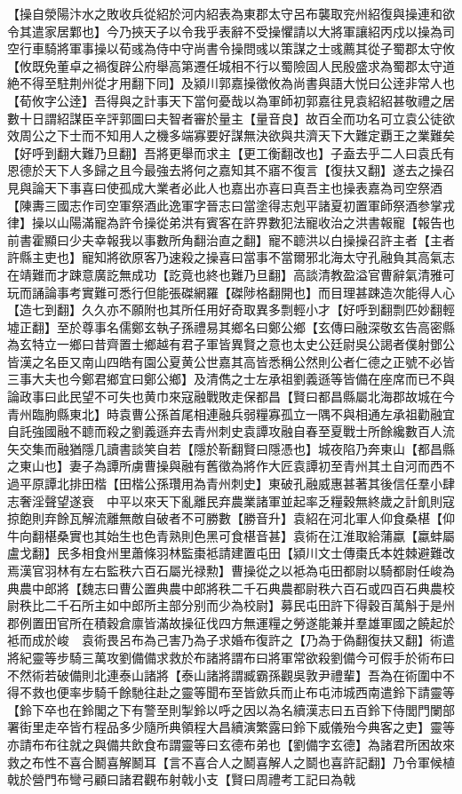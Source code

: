 【操自滎陽汴水之敗收兵從紹於河内紹表為東郡太守呂布襲取兖州紹復與操連和欲令其遣家居鄴也】今乃挾天子以令我乎表辭不受操懼請以大將軍讓紹丙戍以操為司空行車騎將軍事操以荀彧為侍中守尚書令操問彧以策謀之士彧薦其從子蜀郡太守攸【攸既免董卓之禍復辟公府舉高第遷任城相不行以蜀險固人民殷盛求為蜀郡太守道絶不得至駐荆州從才用翻下同】及潁川郭嘉操徵攸為尚書與語大悦曰公逹非常人也【荀攸字公逹】吾得與之計事天下當何憂哉以為軍師初郭嘉往見袁紹紹甚敬禮之居數十日謂紹謀臣辛評郭圖曰夫智者審於量主【量音良】故百全而功名可立袁公徒欲效周公之下士而不知用人之機多端寡要好謀無決欲與共濟天下大難定覇王之業難矣【好呼到翻大難乃旦翻】吾將更舉而求主【更工衡翻改也】子盍去乎二人曰袁氏有恩德於天下人多歸之且今最強去將何之嘉知其不寤不復言【復扶又翻】遂去之操召見與論天下事喜曰使孤成大業者必此人也嘉出亦喜曰真吾主也操表嘉為司空祭酒【陳夀三國志作司空軍祭酒此逸軍字晉志曰當塗得志剋平諸夏初置軍師祭酒参掌戎律】操以山陽滿寵為許令操從弟洪有賓客在許界數犯法寵收治之洪書報寵【報告也前書霍顯曰少夫幸報我以事數所角翻治直之翻】寵不聼洪以白操操召許主者【主者許縣主吏也】寵知將欲原客乃速殺之操喜曰當事不當爾邪北海太守孔融負其高氣志在靖難而才踈意廣訖無成功【訖竟也終也難乃旦翻】高談清教盈溢官曹辭氣清雅可玩而誦論事考實難可悉行但能張磔網羅【磔陟格翻開也】而目理甚踈造次能得人心【造七到翻】久久亦不願附也其所任用好奇取異多剽輕小才【好呼到翻剽匹妙翻輕墟正翻】至於尊事名儒鄭玄執子孫禮易其鄉名曰鄭公鄉【玄傳曰融深敬玄告高密縣為玄特立一鄉曰昔齊置士鄉越有君子軍皆異賢之意也太史公廷尉吳公謁者僕射鄧公皆漢之名臣又南山四皓有園公夏黄公世嘉其高皆悉稱公然則公者仁德之正號不必皆三事大夫也今鄭君鄉宜曰鄭公鄉】及清儁之士左承祖劉義遜等皆備在座席而已不與論政事曰此民望不可失也黄巾來寇融戰敗走保都昌【賢曰都昌縣屬北海郡故城在今青州臨朐縣東北】時袁曹公孫首尾相連融兵弱糧寡孤立一隅不與相通左承祖勸融宜自託強國融不聼而殺之劉義遜弃去青州刺史袁譚攻融自春至夏戰士所餘纔數百人流矢交集而融猶隱几讀書談笑自若【隱於靳翻賢曰隱憑也】城夜陷乃奔東山【都昌縣之東山也】妻子為譚所虜曹操與融有舊徵為將作大匠袁譚初至青州其土自河而西不過平原譚北排田楷【田楷公孫瓚用為青州刺史】東破孔融威惠甚著其後信任羣小肆志奢淫聲望遂衰　中平以來天下亂離民弃農業諸軍並起率乏糧穀無終歲之計飢則寇掠飽則弃餘瓦解流離無敵自破者不可勝數【勝音升】袁紹在河北軍人仰食桑椹【仰牛向翻椹桑實也其始生也色青熟則色黑可食椹音甚】袁術在江淮取給蒲蠃【蠃蚌屬盧戈翻】民多相食州里蕭條羽林監棗袛請建置屯田【潁川文士傳棗氏本姓棘避難改焉漢官羽林有左右監秩六百石屬光禄勲】曹操從之以袛為屯田都尉以騎都尉任峻為典農中郎將【魏志曰曹公置典農中郎將秩二千石典農都尉秩六百石或四百石典農校尉秩比二千石所主如中郎所主部分别而少為校尉】募民屯田許下得穀百萬斛于是州郡例置田官所在積穀倉廪皆滿故操征伐四方無運糧之勞遂能兼并羣雄軍國之饒起於袛而成於峻　袁術畏呂布為己害乃為子求婚布復許之【乃為于偽翻復扶又翻】術遣將紀靈等步騎三萬攻劉備備求救於布諸將謂布曰將軍常欲殺劉備今可假手於術布曰不然術若破備則北連泰山諸將【泰山諸將謂臧霸孫觀吳敦尹禮輩】吾為在術圍中不得不救也便率步騎千餘馳往赴之靈等聞布至皆歛兵而止布屯沛城西南遣鈴下請靈等【鈴下卒也在鈴閣之下有警至則掣鈴以呼之因以為名續漢志曰五百鈴下侍閭門闌部署街里走卒皆冇程品多少隨所典領程大昌續演繁露曰鈴下威儀殆今典客之吏】靈等亦請布布往就之與備共飲食布謂靈等曰玄德布弟也【劉備字玄德】為諸君所困故來救之布性不喜合鬭喜解鬭耳【言不喜合人之鬭喜解人之鬬也喜許記翻】乃令軍候植戟於營門布彎弓顧曰諸君觀布射戟小支【賢曰周禮考工記曰為戟